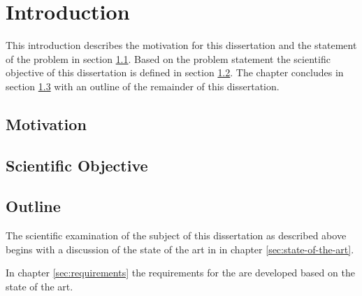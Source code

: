 \chapter{Introduction}
\label{sec:introduction}

This introduction describes the motivation for this dissertation and the statement of the problem in section \ref{sec:motivation}.
Based on the problem statement the scientific objective of this dissertation is defined in section \ref{sec:scientific-objective}.
The chapter concludes in section \ref{sec:outline} with an outline of the remainder of this dissertation.

\section{Motivation}
\label{sec:motivation}

\section{Scientific Objective}
\label{sec:scientific-objective}

\section{Outline}
\label{sec:outline}
The scientific examination of the subject of this dissertation as described above begins with a discussion of the state of the art in  in chapter \ref{sec:state-of-the-art}.

In chapter \ref{sec:requirements} the requirements for the \topic are developed based on the state of the art.
